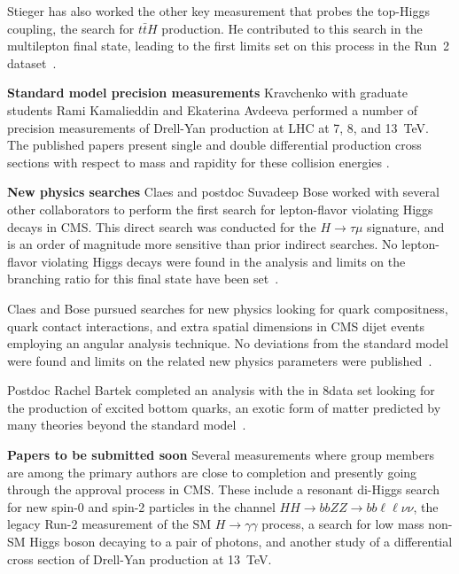 Stieger has also worked the other key measurement that probes the top-Higgs
coupling, the search for $t\bar{t}H$ production.  He contributed to
this search in the multilepton final state, leading to the first limits set
on this process in the Run~2 dataset~\cite{bib:ttHmultilep}.

{\bf Standard model precision measurements} Kravchenko with graduate students Rami Kamalieddin and Ekaterina Avdeeva performed a number of precision measurements of Drell-Yan production at LHC at 7, 8, and 13~TeV. The published papers present single and double differential production cross sections with respect to mass and rapidity for these collision energies \cite{bib:DY7,bib:DY8,bib:DY13}.

{\bf New physics searches}
Claes and postdoc Suvadeep Bose worked with several other collaborators to perform the first search for lepton-flavor violating Higgs decays in CMS. This direct search was conducted for the $H\rightarrow \tau\mu$ signature, and is an order of magnitude more sensitive than prior indirect searches. No lepton-flavor violating Higgs decays were found in the analysis and limits on the branching ratio for this final state have been set~\cite{bib:higgs-LFV}.

Claes and Bose pursued searches for new physics looking for quark compositness, quark contact interactions, and extra spatial dimensions in CMS dijet events employing an angular analysis technique. No deviations from the standard model were found and limits on the related new physics parameters were published~\cite{bib:quark-compositness-etc}.

Postdoc Rachel Bartek completed an analysis with the in 8\TeV data set looking for the production of excited bottom quarks, an exotic form of matter predicted by many theories beyond the standard model~\cite{bib:bstar}. 

{\bf Papers to be submitted soon} Several measurements where group members are among the primary authors are close to completion and presently going through the approval process in CMS. These include a resonant di-Higgs search for new spin-0 and spin-2 particles in the channel $HH\to bbZZ\to bb\ell\ell\nu\nu$, the legacy Run-2 measurement of the SM $H\to\gamma\gamma$ process, a search for low mass non-SM Higgs boson decaying to a pair of photons, and another study of a differential cross section of Drell-Yan production at 13~TeV. 

